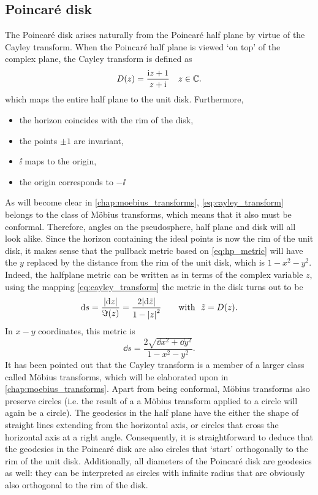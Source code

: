 \subsection{Poincaré disk}
The Poincaré disk arises naturally from the Poincaré half plane by virtue of the Cayley transform. When the Poincaré half plane is viewed `on top' of the complex plane, the Cayley transform is defined as
\begin{equation}
    D(z) = \frac{\mathrm{i} z + 1}{z + \mathrm{i}}\quad z \in \mathbb{C}.
    \label{eq:cayley_transform}
\end{equation}
which maps the entire half plane to the unit disk. Furthermore, 
\begin{itemize}
    \item the horizon coincides with the rim of the disk,
    \item the points \(\pm1\) are invariant,
    \item \(\ii\) maps to the origin, 
    \item the origin corresponds to \(-\ii\)
\end{itemize}
As will become clear in \cref{chap:moebius_transforms}, \cref{eq:cayley_transform} belongs to the class of Möbius transforms, which means that it also must be conformal. Therefore, angles on the pseudosphere, half plane and disk will all look alike. Since the horizon containing the ideal points is now the rim of the unit disk, it makes sense that the pullback metric based on \cref{eq:hp_metric} will have the $y$ replaced by the distance from the rim of the unit disk, which is $1 - x^2 - y^2$. Indeed, the halfplane metric can be written as in terms of the complex variable $z$, using the mapping \cref{eq:cayley_transform} the metric in the disk turns out to be \cite{Needham1997}
\[
    \dd{s} = \frac{\abs{\dd{z}}}{\imaginary(z)} = \frac{2\abs{\dd{\tilde{z}}}}{1 - \abs{z}^2} \qquad \text{with }\ \tilde{z} = D(z).
\]
In \(x-y\) coordinates, this metric is
\begin{equation}
    \dd{s} = \frac{2\sqrt{\dd{x}^2 + \dd{y}^2}}{1 - x^2 - y^2}.
\end{equation}
It has been pointed out that the Cayley transform is a member of a larger class called Möbius transforms, which will be elaborated upon in \cref{chap:moebius_transforms}. Apart from being conformal, Möbius transforms also preserve circles (i.e. the result of a a Möbius transform applied to a circle will again be a circle). The geodesics in the half plane have the either the shape of straight lines extending from the horizontal axis, or circles that cross the horizontal axis at a right angle. Consequently, it is straightforward to deduce that the geodesics in the Poincaré disk are also circles that `start' orthogonally to the rim of the unit disk. Additionally, all diameters of the Poincaré disk are geodesics as well: they can be interpreted as circles with infinite radius that are obviously also orthogonal to the rim of the disk.

